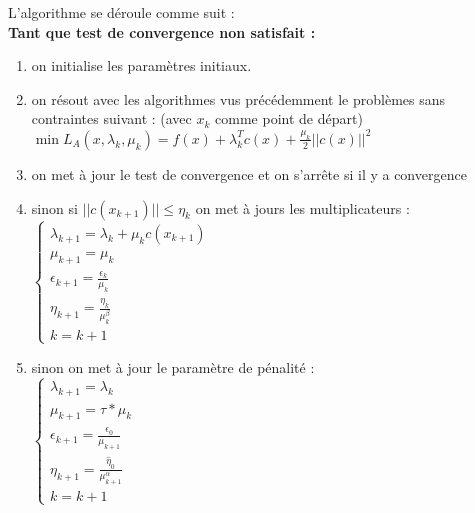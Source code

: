 \documentclass[a4paper,12pt]{article}
\theoremstyle{break}
\begin{document}
L'algorithme se déroule comme suit :\\
\textbf{Tant que test de convergence non satisfait :}
\begin{enumerate}
	\item on initialise les paramètres initiaux.
	\item on résout avec les algorithmes vus précédemment le problèmes sans contraintes suivant : (avec $x_k$ comme point de départ) \\
	 $ \min L_A(x, \lambda_k, \mu_k) = f(x) + \lambda_k^T c(x) + \frac{\mu_k}{2} ||c(x)||^2$
	\item on met à jour le test de convergence et on s'arrête si il y a convergence
	\item sinon si $||c(x_{k+1})|| \leq \eta_k$ on met à jours les multiplicateurs : \\
	$\begin{cases}
			\lambda_{k+1} = \lambda_k + \mu_k c(x_{k+1})\\
			\mu_{k+1} = \mu_k\\
			\epsilon_{k+1} = \frac{\epsilon_k}{\mu_k}\\
			\eta_{k+1} = \frac{\eta_k}{\mu_k^{\beta}} \\
			k = k+1
		\end{cases}$
	\item sinon on met à jour le paramètre de pénalité : \\
	$\begin{cases}
			\lambda_{k+1} = \lambda_k \\
			\mu_{k+1} = \tau * \mu_k\\
			\epsilon_{k+1} = \frac{\epsilon_0}{\mu_{k+1}}\\
			\eta_{k+1} = \frac{\hat{\eta}_0}{\mu_{k+1}^{\alpha}} \\
			k = k+1
		\end{cases}$
\end{enumerate}
\end{document}
